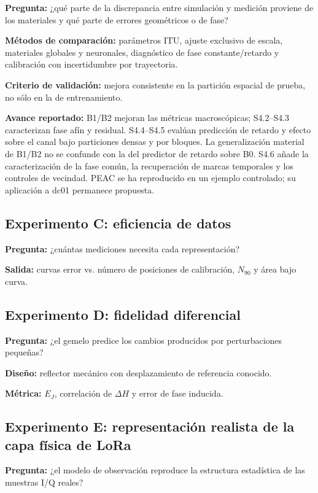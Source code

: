 \textbf{Pregunta:} ¿qué parte de la discrepancia entre simulación y medición proviene de los materiales y qué parte de errores geométricos o de fase?

\textbf{Métodos de comparación:} parámetros ITU, ajuste exclusivo de escala, materiales globales y neuronales, diagnóstico de fase constante/retardo y calibración con incertidumbre por trayectoria.

\textbf{Criterio de validación:} mejora consistente en la partición espacial de prueba, no sólo en la de entrenamiento.

\textbf{Avance reportado:} B1/B2 mejoran las métricas macroscópicas; S4.2--S4.3 caracterizan fase afín y residual. S4.4--S4.5 evalúan predicción de retardo y efecto sobre el canal bajo particiones densas y por bloques. La generalización material de B1/B2 no se confunde con la del predictor de retardo sobre B0. S4.6 añade la caracterización de la fase común, la recuperación de marcas temporales y los controles de vecindad. PEAC se ha reproducido en un ejemplo controlado; su aplicación a dc01 permanece propuesta.

\subsection{Experimento C: eficiencia de datos}

\textbf{Pregunta:} ¿cuántas mediciones necesita cada representación?

\textbf{Salida:} curvas error vs. número de posiciones de calibración, $N_{90}$ y área bajo curva.

\subsection{Experimento D: fidelidad diferencial}

\textbf{Pregunta:} ¿el gemelo predice los cambios producidos por perturbaciones pequeñas?

\textbf{Diseño:} reflector mecánico con desplazamiento de referencia conocido.

\textbf{Métrica:} $E_J$, correlación de $\Delta H$ y error de fase inducida.

\subsection{Experimento E: representación realista de la capa física de LoRa}

\textbf{Pregunta:} ¿el modelo de observación reproduce la estructura estadística de las muestras I/Q reales?

